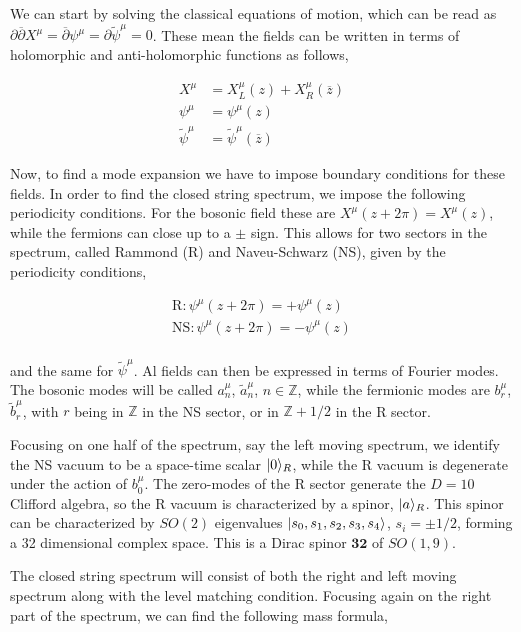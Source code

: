We can start by solving the classical equations of motion, which can be read as $\partial \overline{\partial} X^\mu = \overline{\partial} \psi^\mu = \partial \tilde{\psi}^\mu = 0$. These mean the fields can be written in terms of holomorphic and anti-holomorphic functions as follows,

\begin{align*}
    X^\mu &= X_L^\mu (z) + X_R^\mu (\overline{z}) \\
    \psi^\mu &= \psi^\mu (z) \\
    \tilde{\psi}^\mu &= \tilde{\psi}^\mu (\overline{z})
\end{align*}

Now, to find a mode expansion we have to impose boundary conditions for these fields. In order to find the closed string spectrum, we impose the following periodicity conditions. For the bosonic field these are $X^\mu (z+2\pi) = X^\mu (z)$, while the fermions can close up to a $\pm$ sign. This allows for two sectors in the spectrum, called Rammond (R) and Naveu-Schwarz (NS), given by the periodicity conditions,

\begin{align*}
    \mathrm{R} : \psi^\mu (z + 2\pi) = +\psi^\mu (z) \\
    \mathrm{NS} : \psi^\mu (z + 2\pi) = -\psi^\mu (z) \\
\end{align*}

and the same for $\tilde{\psi}^\mu$. Al fields can then be expressed in terms of Fourier modes. The bosonic modes will be called $a^\mu_n$, $\tilde{a}^\mu_n$, $n\in \mathbb{Z}$, while the fermionic modes are $b^\mu_r$, $\tilde{b}^\mu_r$, with $r$ being in $\mathbb{Z}$ in the NS sector, or in $\mathbb{Z}+1/2$ in the R sector.

Focusing on one half of the spectrum, say the left moving spectrum, we identify the NS vacuum to be a space-time scalar $\lvert0\rangle_R$, while the R vacuum is degenerate under the action of $b^\mu_0$. The zero-modes of the R sector generate the $D=10$ Clifford algebra, so the R vacuum is characterized by a spinor, $\lvert a\rangle_R$. This spinor can be characterized by $SO(2)$ eigenvalues $\lvert s_0,s_1,s_2,s_3,s_4\rangle$, $s_i = \pm 1/2$, forming a 32 dimensional complex space. This is a Dirac spinor $\mathbf{32}$ of $SO(1,9)$.

The closed string spectrum will consist of both the right and left moving spectrum along with the level matching condition. Focusing again on the right part of the spectrum, we can find the following mass formula,

